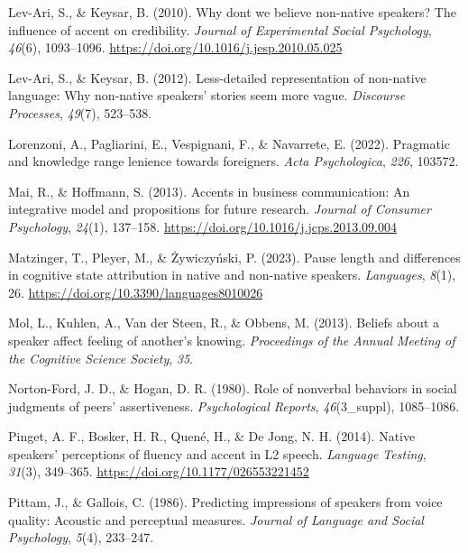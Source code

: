 \documentclass[
  man,floatsintext]{apa7}
\newlength{\cslhangindent}
\newlength{\cslentryspacingunit} %
\newenvironment{CSLReferences}[2] %
 {%
  \setlength{\parindent}{0pt}
  \ifodd #1
  \let\oldpar\par
  \def\par{\hangindent=\cslhangindent\oldpar}
  \fi
  \setlength{\parskip}{#2\cslentryspacingunit}
 }%
 {}
\begin{document}
\begin{CSLReferences}{1}{0}
\leavevmode{}%
Lev-Ari, S., \& Keysar, B. (2010). Why don{\textquotesingle}t we believe non-native speakers? {The influence of accent on credibility}. \emph{Journal of Experimental Social Psychology}, \emph{46}(6), 1093--1096. \url{https://doi.org/10.1016/j.jesp.2010.05.025}

\leavevmode{}%
Lev-Ari, S., \& Keysar, B. (2012). Less-detailed representation of non-native language: Why non-native speakers' stories seem more vague. \emph{Discourse Processes}, \emph{49}(7), 523--538.

\leavevmode{}%
Lorenzoni, A., Pagliarini, E., Vespignani, F., \& Navarrete, E. (2022). Pragmatic and knowledge range lenience towards foreigners. \emph{Acta Psychologica}, \emph{226}, 103572.

\leavevmode{}%
Mai, R., \& Hoffmann, S. (2013). Accents in business communication: An integrative model and propositions for future research. \emph{Journal of Consumer Psychology}, \emph{24}(1), 137--158. \url{https://doi.org/10.1016/j.jcps.2013.09.004}

\leavevmode{}%
Matzinger, T., Pleyer, M., \& Żywiczyński, P. (2023). Pause length and differences in cognitive state attribution in native and non-native speakers. \emph{Languages}, \emph{8}(1), 26. \url{https://doi.org/10.3390/languages8010026}

\leavevmode{}%
Mol, L., Kuhlen, A., Van der Steen, R., \& Obbens, M. (2013). Beliefs about a speaker affect feeling of another's knowing. \emph{Proceedings of the Annual Meeting of the Cognitive Science Society}, \emph{35}.

\leavevmode{}%
Norton-Ford, J. D., \& Hogan, D. R. (1980). Role of nonverbal behaviors in social judgments of peers' assertiveness. \emph{Psychological Reports}, \emph{46}(3\_suppl), 1085--1086.

\leavevmode{}%
Pinget, A. F., Bosker, H. R., Quené, H., \& De Jong, N. H. (2014). Native speakers' perceptions of fluency and accent in {L2} speech. \emph{Language Testing}, \emph{31}(3), 349--365. \url{https://doi.org/10.1177/026553221452}

\leavevmode{}%
Pittam, J., \& Gallois, C. (1986). Predicting impressions of speakers from voice quality: Acoustic and perceptual measures. \emph{Journal of Language and Social Psychology}, \emph{5}(4), 233--247.


\end{CSLReferences}
\end{document}
